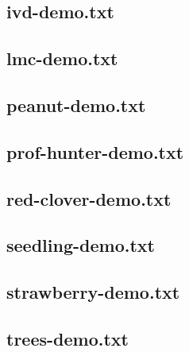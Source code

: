 \documentclass[11pt]{article}
\begin{document}
\newpage
\subsection{ivd-demo.txt}


\newpage
\subsection{lmc-demo.txt}


\newpage
\subsection{peanut-demo.txt}


\newpage
\subsection{prof-hunter-demo.txt}


\newpage
\subsection{red-clover-demo.txt}


\newpage
\subsection{seedling-demo.txt}


\newpage
\subsection{strawberry-demo.txt}


\newpage
\subsection{trees-demo.txt}

\end{document}
